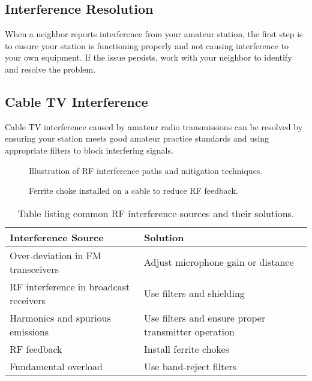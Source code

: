 \subsection*{Interference Resolution}
When a neighbor reports interference from your amateur station, the first step is to ensure your station is functioning properly and not causing interference to your own equipment. If the issue persists, work with your neighbor to identify and resolve the problem.

\subsection*{Cable TV Interference}
Cable TV interference caused by amateur radio transmissions can be resolved by ensuring your station meets good amateur practice standards and using appropriate filters to block interfering signals.

\begin{figure}[h!]
    \centering
    \caption{Illustration of RF interference paths and mitigation techniques.}
    \label{fig:rf_interference}
\end{figure}

\begin{figure}[h!]
    \centering
    \caption{Ferrite choke installed on a cable to reduce RF feedback.}
    \label{fig:ferrite_choke}
\end{figure}

\begin{table}[h!]
    \centering
    \begin{tabular}{|l|l|}
        \hline
        \textbf{Interference Source} & \textbf{Solution} \\
        \hline
        Over-deviation in FM transceivers & Adjust microphone gain or distance \\
        RF interference in broadcast receivers & Use filters and shielding \\
        Harmonics and spurious emissions & Use filters and ensure proper transmitter operation \\
        RF feedback & Install ferrite chokes \\
        Fundamental overload & Use band-reject filters \\
        \hline
    \end{tabular}
    \caption{Table listing common RF interference sources and their solutions.}
    \label{tab:rf_interference_solutions}
\end{table}

